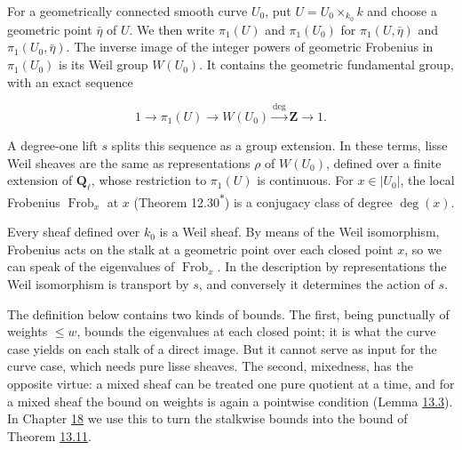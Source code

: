 \documentclass[11pt]{article}
\newcommand{\bpout}[1]{#1\textsuperscript{\hyperlink{bp-outside}{\ensuremath{\ast}}}}
\begin{document}
For a geometrically connected smooth curve \(U_0\), put \(U=U_0\times_{k_0}k\) and choose a geometric point \(\bar\eta\) of \(U\). We then write \(\pi_1(U)\) and \(\pi_1(U_0)\) for \(\pi_1(U,\bar\eta)\) and \(\pi_1(U_0,\bar\eta)\).  The inverse image of the integer powers of geometric Frobenius in \(\pi_1(U_0)\) is its Weil group \(W(U_0)\).  It contains the geometric fundamental group, with an exact sequence

\[
1\longrightarrow \pi_1(U)\longrightarrow W(U_0)
\xrightarrow{\deg}\mathbf Z\longrightarrow1.
\]

A degree-one lift \(s\) splits this sequence as a group extension. In these terms, lisse Weil sheaves are the same as representations \(\rho\) of \(W(U_0)\), defined over a finite extension of \(\mathbf Q_\ell\), whose restriction to \(\pi_1(U)\) is continuous. For \(x\in|U_0|\), the local Frobenius \(\operatorname{Frob}_x\) at \(x\) (Theorem \bpout{12.30}) is a conjugacy class of degree \(\deg(x)\).

\label{bp8}%
Every sheaf defined over \(k_0\) is a Weil sheaf. By means of the Weil isomorphism, Frobenius acts on the stalk at a geometric point over each closed point \(x\), so we can speak of the eigenvalues of \(\operatorname{Frob}_x\). In the description by representations the Weil isomorphism is transport by \(s\), and conversely it determines the action of \(s\).

The definition below contains two kinds of bounds. The first, being punctually of weights \(\le w\), bounds the eigenvalues at each closed point; it is what the curve case yields on each stalk of a direct image. But it cannot serve as input for the curve case, which needs pure lisse sheaves. The second, mixedness, has the opposite virtue: a mixed sheaf can be treated one pure quotient at a time, and for a mixed sheaf the bound on weights is again a pointwise condition (Lemma \hyperref[bp14]{13.3}). In Chapter \hyperref[bp271]{18} we use this to turn the stalkwise bounds into the bound of Theorem \hyperref[bp38]{13.11}.
\end{document}
